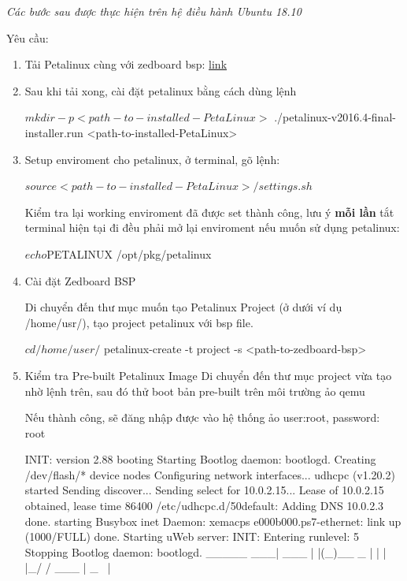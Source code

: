 \documentclass[a4paper]{report}
\begin{document}
\label{section:buildpetalinux}
\textit{Các bước sau được thực hiện trên hệ điều hành Ubuntu 18.10}
\par
Yêu cầu:
\begin{enumerate}
\item Tải Petalinux cùng với zedboard bsp: \href{https://www.xilinx.com/support/download/index.html/content/xilinx/en/downloadNav/embedded-design-tools.html}{link}
\item Sau khi tải xong, cài đặt petalinux bằng cách dùng lệnh 

\begin{lst}
$ mkdir -p <path-to-installed-PetaLinux>
$ ./petalinux-v2016.4-final-installer.run <path-to-installed-PetaLinux>
\end{lst}

\item Setup enviroment cho petalinux, ở terminal, gõ lệnh:

\begin{lst}
$ source <path-to-installed-PetaLinux>/settings.sh 
$
\end{lst}

Kiểm tra lại working enviroment đã được set thành công, lưu ý \textbf{mỗi lần} tắt terminal hiện tại đi đều phải mở lại enviroment nếu muốn sử dụng petalinux:

\begin{lst}
$echo $PETALINUX
/opt/pkg/petalinux
\end{lst}

\item{Cài đặt Zedboard BSP}

Di chuyển đến thư mục muốn tạo Petalinux Project (ở dưới ví dụ /home/usr/), tạo project petalinux với bsp file.

\begin{lst}
$ cd /home/user/
$ petalinux-create -t project -s <path-to-zedboard-bsp>
\end{lst}

\item Kiểm tra Pre-built Petalinux Image
Di chuyển đến thư mục project vừa tạo nhờ lệnh trên, sau đó thử boot bản pre-built trên môi trường ảo qemu 


Nếu thành công, sẽ đăng nhập được vào hệ thống ảo {user:root, password: root}

\begin{lst}
INIT: version 2.88 booting
Starting Bootlog daemon: bootlogd.
Creating /dev/flash/* device nodes
Configuring network interfaces... udhcpc (v1.20.2) started
Sending discover...
Sending select for 10.0.2.15...
Lease of 10.0.2.15 obtained, lease time 86400
/etc/udhcpc.d/50default: Adding DNS 10.0.2.3
done.
starting Busybox inet Daemon: 
xemacps e000b000.ps7-ethernet: link up (1000/FULL)
done.
Starting uWeb server:
INIT: Entering runlevel: 5
Stopping Bootlog daemon: bootlogd.
_____
___| ___ 
| |(_)__ _ | |
| |_/ / ___ | 
_
\ |


\end{lst}
\end{enumerate}
\end{document}
